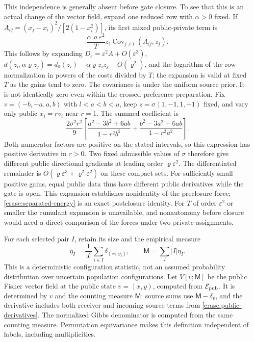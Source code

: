 This independence is generally absent before gate closure. To see that this is an actual change of the vector field, expand one reduced row with $\alpha>0$ fixed. If
$A_{ij}=(x_j-x_i)^2/[2(1-x_i^2)]$, its first mixed public-private term is
\begin{equation}
 \frac{\alpha\varrho\varepsilon^2}{T}
 z_i\operatorname{Cov}_{j\ne i}(A_{ij},z_j).
 \label{erase:mixed-term}
\end{equation}
This follows by expanding $D_\varepsilon=\varepsilon^2A+O(\varepsilon^3)$, $d(z_i,\alpha\varrho z_j)=d_0(z_i)-\alpha\varrho z_i z_j+O(\varrho^2)$, and the logarithm of the row normalization in powers of the costs divided by $T$; the expansion is valid at fixed $T$ as the gains tend to zero. The covariance is under the uniform source prior. It is not identically zero even within the crossed-preference preparation. Fix $v=(-b,-a,a,b)$ with $l<a<b<u$, keep $z=\sigma(1,-1,1,-1)$ fixed, and vary only public $x_i=r v_i$ near $r=1$. The summed coefficient is
\begin{equation}
 \frac{2\sigma^2r^2}{9}\left[
 \frac{a^2-3b^2+6ab}{1-r^2b^2}
 +\frac{b^2-3a^2+6ab}{1-r^2a^2}\right].
 \label{erase:mixed-witness}
\end{equation}
Both numerator factors are positive on the stated intervals, so this expression has positive derivative in $r>0$. Two fixed admissible values of $\sigma$ therefore give different public directional gradients at leading order $\varrho\varepsilon^2$. The differentiated remainder is $O(\varrho\varepsilon^3+\varrho^2\varepsilon^2)$ on these compact sets. For sufficiently small positive gains, equal public data thus have different public derivatives while the gate is open. This expansion establishes nonidentity of the preclosure force; \cref{erase:separated-energy} is an exact postclosure identity. For $T$ of order $\varepsilon^2$ or smaller the cumulant expansion is unavailable, and nonautonomy before closure would need a direct comparison of the forces under two private assignments.

For each selected pair $I$, retain its size and the empirical measure
\begin{equation}
 \eta_I=\frac1{|I|}\sum_{i\in I}\delta_{(x_i,y_i)},\qquad
 \mathsf M=\sum_I|I|\eta_I.
 \label{erase:parent-state}
\end{equation}
This is a deterministic configuration statistic, not an assumed probability distribution over uncertain population configurations. Let $V[v;\mathsf M]$ be the public Fisher vector field at the public state $v=(x,y)$, computed from $\mathcal E_{\rm pub}$. It is determined by $v$ and the counting measure $\mathsf M$: source sums use $\mathsf M-\delta_v$, and the derivative includes both receiver and incoming source terms from \cref{erase:public-derivatives}. The normalized Gibbs denominator is computed from the same counting measure. Permutation equivariance makes this definition independent of labels, including multiplicities.


